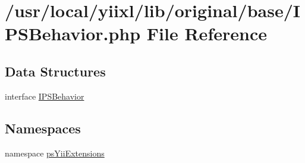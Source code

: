 \hypertarget{IPSBehavior_8php}{
\section{/usr/local/yiixl/lib/original/base/IPSBehavior.php File Reference}
\label{IPSBehavior_8php}
}
\subsection*{Data Structures}
\begin{DoxyCompactItemize}
\item 
interface \hyperlink{interfaceIPSBehavior}{IPSBehavior}
\end{DoxyCompactItemize}
\subsection*{Namespaces}
\begin{DoxyCompactItemize}
\item 
namespace \hyperlink{namespacepsYiiExtensions}{psYiiExtensions}
\end{DoxyCompactItemize}
